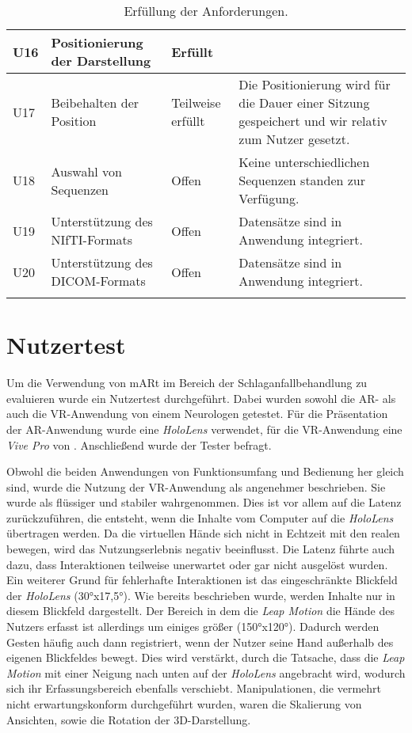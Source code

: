 \begin{longtable}{p{}p{}C{.1\textwidth}p{.52\textwidth}}
\midrule 
U16 & Positionierung der Darstellung & Erfüllt & \\
\midrule 
U17 & Beibehalten der Position & Teilweise erfüllt & Die Positionierung wird für die Dauer einer Sitzung gespeichert und wir relativ zum Nutzer gesetzt.\\
\midrule 
U18 & Auswahl von Sequenzen & Offen & Keine unterschiedlichen Sequenzen standen zur Verfügung.\\
\midrule 
U19 & Unterstützung des NIfTI-Formats & Offen & Datensätze sind in Anwendung integriert.\\
\midrule 
U20 & Unterstützung des DICOM-Formats & Offen & Datensätze sind in Anwendung integriert.\\

\bottomrule
\caption{\label{tab:evaluation}Erfüllung der Anforderungen.}
\end{longtable}

\section{Nutzertest}
\label{nutzertest}

Um die Verwendung von mARt im Bereich der Schlaganfallbehandlung zu evaluieren wurde ein Nutzertest durchgeführt. 
Dabei wurden sowohl die AR- als auch die VR-Anwendung von einem Neurologen getestet. Für die Präsentation der AR-Anwendung wurde eine \textit{HoloLens} verwendet, für die VR-Anwendung eine \textit{Vive Pro} von \cite{vivePro}. Anschließend wurde der Tester befragt.

Obwohl die beiden Anwendungen von Funktionsumfang und Bedienung her gleich sind, wurde die Nutzung der VR-Anwendung als angenehmer beschrieben. 
Sie wurde als flüssiger und stabiler wahrgenommen. 
Dies ist vor allem auf die Latenz zurückzuführen, die entsteht, wenn die Inhalte vom Computer auf die \textit{HoloLens} übertragen werden. Da die virtuellen Hände sich nicht in Echtzeit mit den realen bewegen, wird das Nutzungserlebnis negativ beeinflusst. 
Die Latenz führte auch dazu, dass Interaktionen teilweise unerwartet oder gar nicht ausgelöst wurden. 
Ein weiterer Grund für fehlerhafte Interaktionen ist das eingeschränkte Blickfeld der \textit{HoloLens} (30°x17,5°). Wie bereits beschrieben wurde, werden Inhalte nur in diesem Blickfeld dargestellt. Der Bereich in dem die \textit{Leap Motion} die Hände des Nutzers erfasst ist allerdings um einiges größer (150°x120°). Dadurch werden Gesten häufig auch dann registriert, wenn der Nutzer seine Hand außerhalb des eigenen Blickfeldes bewegt. Dies wird verstärkt, durch die Tatsache, dass die \textit{Leap Motion} mit einer Neigung nach unten auf der \textit{HoloLens} angebracht wird, wodurch sich ihr Erfassungsbereich ebenfalls verschiebt.
Manipulationen, die vermehrt nicht erwartungskonform durchgeführt wurden, waren die Skalierung von Ansichten, sowie die Rotation der 3D-Darstellung.

